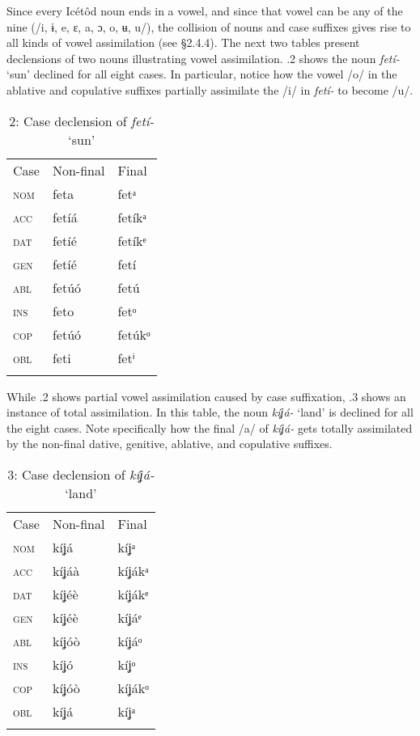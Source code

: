 Since every Icétôd noun ends in a vowel, and since that vowel can be any of the nine (/i, ɨ, e, ɛ, a, ɔ, o, ʉ, u/), the collision of nouns and case suffixes gives rise to all kinds of vowel assimilation (see §2.4.4). The next two tables present declensions of two nouns illustrating vowel assimilation. .2 shows the noun \textit{fetí-} ‘sun’ declined for all eight cases. In particular, notice how the vowel /o/ in the ablative and copulative suffixes partially assimilate the /i/ in \textit{fetí-} to become /u/. 


\begin{table}
\caption{2: Case declension of \textit{fetí-} ‘sun’}
\label{tab:7}


\begin{tabularx}{\textwidth}{XXX}
\lsptoprule

Case & Non-final & Final\\
\textsc{nom} & feta & fetᵃ\\
\textsc{acc} & fetíá & fetíkᵃ\\
\textsc{dat} & fetíé & fetíkᵉ\\
\textsc{gen} & fetíé & fetí\\
\textsc{abl} & fetúó & fetú\\
\textsc{ins} & feto & fetᵒ\\
\textsc{cop} & fetúó & fetúkᵒ\\
\textsc{obl} & feti & fetⁱ\\
\lspbottomrule
\end{tabularx}
\end{table}
While .2 shows partial vowel assimilation caused by case suffixation, .3 shows an instance of total assimilation. In this table, the noun \textit{kíʝá-} ‘land’ is declined for all the eight cases. Note specifically how the final /a/ of \textit{kíʝá-} gets totally assimilated by the non-final dative, genitive, ablative, and copulative suffixes.


\begin{table}
\caption{3: Case declension of \textit{kíʝá-} ‘land’}
\label{tab:7}


\begin{tabularx}{\textwidth}{XXX}
\lsptoprule

Case & Non-final & Final\\
\textsc{nom} & kíʝá & kíʝᵃ\\
\textsc{acc} & kíʝáà & kíʝákᵃ\\
\textsc{dat} & kíʝéè & kíʝákᵉ\\
\textsc{gen} & kíʝéè & kíʝáᵉ\\
\textsc{abl} & kíʝóò & kíʝáᵒ\\
\textsc{ins} & kíʝó & kíʝᵒ\\
\textsc{cop} & kíʝóò & kíʝákᵒ\\
\textsc{obl} & kíʝá & kíʝᵃ\\
\lspbottomrule
\end{tabularx}
\end{table}




